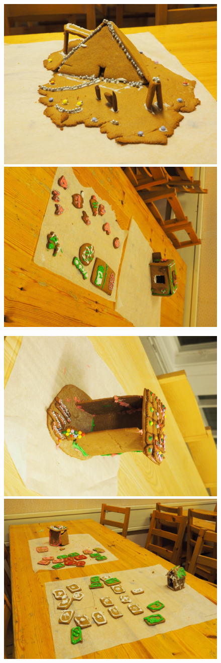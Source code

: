 \begin{multicols}{2}
\begin{figure}[p]
\centering
\includegraphics[width=.475\textwidth,height=.475\textwidth,keepaspectratio]{assets/pipari1}\hfill\includegraphics[width=.475\textwidth,height=.475\textwidth,keepaspectratio,angle=90]{assets/pipari2}

\vspace*{.05\textwidth}

\includegraphics[width=.475\textwidth,height=.475\textwidth,keepaspectratio,angle=90]{assets/pipari4}\hfill\includegraphics[width=.475\textwidth,height=.475\textwidth,keepaspectratio]{assets/pipari3}


\end{figure}
\end{multicols}
